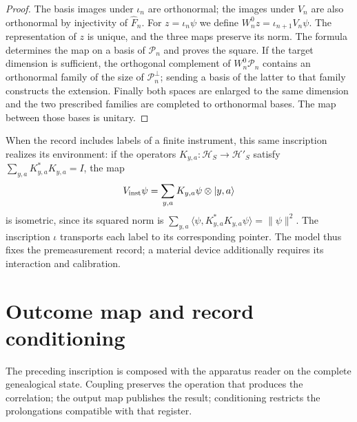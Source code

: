 \begin{proof}
The basis images under \(\iota_n\) are orthonormal; the
images under \(V_n\) are also orthonormal by injectivity of
\(\widehat F_n\). For \(z=\iota_n\psi\) we define
\(W_n^0z=\iota_{n+1}V_n\psi\). The representation of \(z\) is unique,
and the three maps preserve its norm. The formula determines the map on
a basis of \(\mathcal P_n\) and proves the square.
If the target dimension is sufficient, the orthogonal complement of
\(W_n^0\mathcal P_n\) contains an orthonormal family of the size of
\(\mathcal P_n^\perp\); sending a basis of the latter to that family
constructs the extension. Finally both spaces are enlarged to
the same dimension and the two prescribed families are completed to orthonormal
bases. The map between those bases is unitary.
\end{proof}

When the record includes labels of a finite instrument, this same
inscription realizes its environment: if the operators
\(K_{y,a}:\mathcal H_S\to\mathcal H'_S\) satisfy
\(\sum_{y,a}K_{y,a}^*K_{y,a}=I\), the map
\[
 V_{\rm inst}\psi=\sum_{y,a}K_{y,a}\psi\otimes|y,a\rangle
\]
is isometric, since its squared norm is
\(\sum_{y,a}\langle\psi,K_{y,a}^*K_{y,a}\psi\rangle=\|\psi\|^2\).
The inscription \(\iota\) transports each label to its corresponding
pointer. The model thus fixes the premeasurement record; a
material device additionally requires its interaction and calibration.


\section{Outcome map and record conditioning}
\label{x_reciprocidad:vii:sec:salida-condicionamiento}

The preceding inscription is composed with the apparatus reader on the
complete genealogical state. Coupling preserves the operation that
produces the correlation; the output map publishes the result;
conditioning restricts the prolongations compatible with that register.

